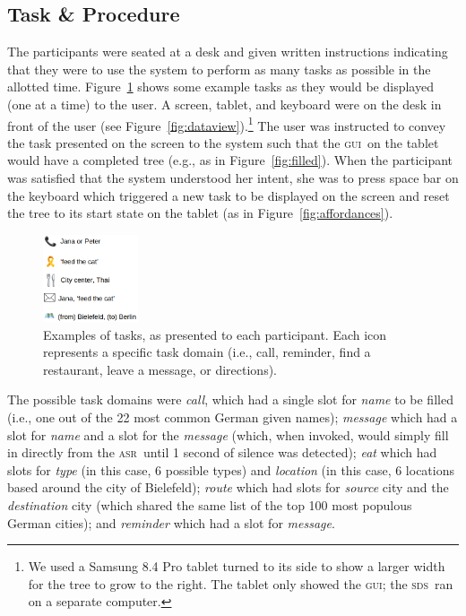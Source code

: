 \documentclass[11pt]{article}
\newcommand{\sds}[0]{\textsc{sds}}
\newcommand{\asr}[0]{\textsc{asr}}
\newcommand{\ui}[0]{\textsc{gui}}
\begin{document}
\subsection{Task \& Procedure} 
\label{section:task_procedure}

The participants were seated at a desk and given written instructions indicating that they were to use the system to perform as many tasks as possible in the allotted time. Figure~\ref{fig:taskex} shows some example tasks as they would be displayed (one at a time) to the user. A screen, tablet, and keyboard were on the desk in front of the user (see Figure~\ref{fig:dataview}).\footnote{We used a Samsung 8.4 Pro tablet turned to its side to show a larger width for the tree to grow to the right. The tablet only showed the \ui; the \sds\ ran on a separate computer.}  The user was instructed to convey the task presented on the screen to the system such that the \ui\ on the tablet would have a completed tree (e.g., as in Figure~\ref{fig:filled}). When the participant was satisfied that the system understood her intent, she was to press space bar on the keyboard which triggered a new task to be displayed on the screen and reset the tree to its start state on the tablet (as in Figure~\ref{fig:affordances}). 

\begin{figure}
  \centering
      \includegraphics[width=0.25\textwidth]{figures/taskexample.png}	
      \caption{Examples of tasks, as presented to each participant. Each icon represents a specific task domain (i.e., call, reminder, find a restaurant, leave a message, or directions).\label{fig:taskex}}
\end{figure}

The possible task domains were \emph{call}, which had a single slot for \emph{name} to be filled (i.e., one out of the 22 most common German given names); \emph{message} which had a slot for \emph{name} and a slot for the \emph{message} (which, when invoked, would simply fill in directly from the \asr\ until 1 second of silence was detected); \emph{eat} which had slots for \emph{type} (in this case, 6 possible types) and \emph{location} (in this case, 6 locations based around the city of Bielefeld); \emph{route} which had slots for \emph{source} city and the \emph{destination} city (which shared the same list of the top 100 most populous German cities); and \emph{reminder} which had a slot for \emph{message}. 
\end{document}
